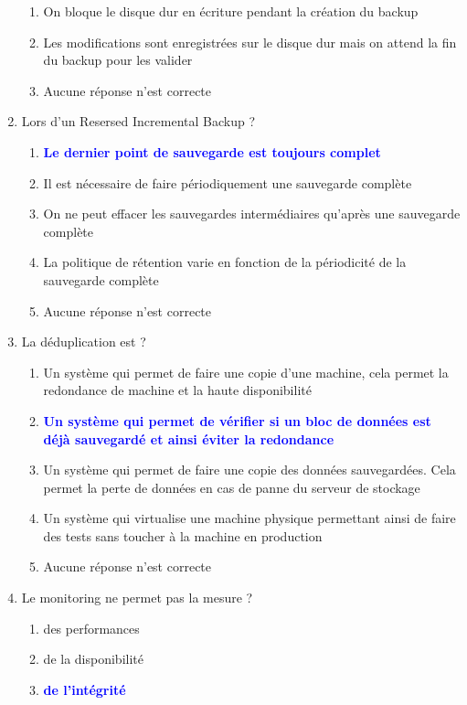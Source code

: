 \documentclass[a4paper]{article}
\begin{document}
\begin{enumerate}
\begin{enumerate}
        \item On bloque le disque dur en écriture pendant la création du backup
        \item Les modifications sont enregistrées sur le disque dur mais on attend la fin du backup pour les valider
        \item Aucune réponse n'est correcte
    \end{enumerate}
    \item Lors d'un Resersed Incremental Backup ?
    \begin{enumerate}
        \item \textcolor{blue}{\textbf{Le dernier point de sauvegarde est toujours complet}}
        \item Il est nécessaire de faire périodiquement une sauvegarde complète
        \item On ne peut effacer les sauvegardes intermédiaires qu'après une sauvegarde complète
        \item La politique de rétention varie en fonction de la périodicité de la sauvegarde complète
        \item Aucune réponse n'est correcte
    \end{enumerate}
    \item La déduplication est ?
    \begin{enumerate}
        \item Un système qui permet de faire une copie d'une machine, cela permet la redondance de machine et la haute disponibilité
        \item \textcolor{blue}{\textbf{Un système qui permet de vérifier si un bloc de données est déjà sauvegardé et ainsi éviter la redondance}}
        \item Un système qui permet de faire une copie des données sauvegardées. Cela permet la perte de données en cas de panne du serveur de stockage
        \item Un système qui virtualise une machine physique permettant ainsi de faire des tests sans toucher à la machine en production
        \item Aucune réponse n'est correcte
    \end{enumerate}
    \item Le monitoring ne permet pas la mesure ?
    \begin{enumerate}
        \item des performances
        \item de la disponibilité
        \item \textcolor{blue}{\textbf{de l'intégrité}}

\end{enumerate}
\end{enumerate}
\end{document}
